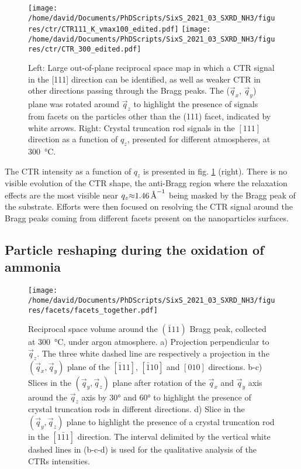 \begin{figure}[!htb]
    \centering
    \texttt{[image: /home/david/Documents/PhDScripts/SixS\_2021\_03\_SXRD\_NH3/figures/ctr/CTR111\_K\_vmax100\_edited.pdf]}
    \texttt{[image: /home/david/Documents/PhDScripts/SixS\_2021\_03\_SXRD\_NH3/figures/ctr/CTR\_300\_edited.pdf]}
    \caption{
        Left: Large out-of-plane reciprocal space map in which a CTR signal in the [111] direction can be identified, as well as weaker CTR in other directions passing through the Bragg peaks.
        The ($\vec{q}_x$, $\vec{q}_y$) plane was rotated around $\vec{q}_z$ to highlight the presence of signals from facets on the particles other than the (111) facet, indicated by white arrows.
        Right: Crystal truncation rod signals in the $[111]$ direction as a function of $q_z$, presented for different atmospheres, at \qty{300}{\degreeCelsius}.
    }
    \label{fig:2DCTR111Particles}
\end{figure}

The CTR intensity as a function of $q_z$ is presented in fig. \ref{fig:2DCTR111Particles} (right).
There is no visible evolution of the CTR shape, the anti-Bragg region where the relaxation effects are the most visible near $q_z \qty{\approx1.46}{\per\angstrom}$ being masked by the Bragg peak of the substrate.
Efforts were then focused on resolving the CTR signal around the Bragg peaks coming from different facets present on the nanoparticles surfaces.

\subsection{Particle reshaping during the oxidation of ammonia}

\begin{figure}[!htb]
    \centering
    \texttt{[image: /home/david/Documents/PhDScripts/SixS\_2021\_03\_SXRD\_NH3/figures/facets/facets\_together.pdf]}
    \caption{
        Reciprocal space volume around the $(\bar{1}11)$ Bragg peak, collected at \qty{300}{\degreeCelsius}, under argon atmosphere.
        a) Projection perpendicular to $\vec{q}_z$.
        The three white dashed line are respectively a projection in the $(\vec{q}_x, \vec{q}_y)$ plane of the $[\bar{1}11]$, $[\bar{1}10]$ and $[010]$ directions.
        b-c) Slices in the $(\vec{q}_y, \vec{q}_z)$ plane after rotation of the $\vec{q}_x$ and $\vec{q}_y$ axis around the $\vec{q}_z$ axis by \ang{30} and \ang{60} to highlight the presence of crystal truncation rods in different directions.
        d) Slice in the $(\vec{q}_y, \vec{q}_z)$ plane to highlight the presence of a crystal truncation rod in the $[1\bar{1}1]$ direction.
        The interval delimited by the vertical white dashed lines in (b-c-d) is used for the qualitative analysis of the CTRs intensities.
    }
    \label{fig:FacetMaps}
\end{figure}

